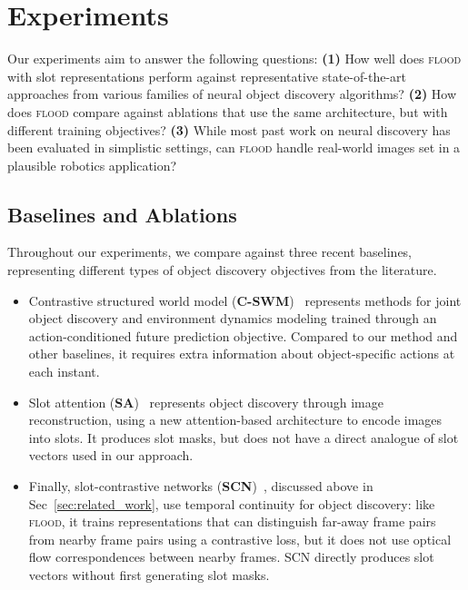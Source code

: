 \documentclass{article}
\begin{document}
\section{Experiments}
\label{sec:experiments}

Our experiments aim to answer the following questions: \textbf{(1)} How well does \textsc{flood} with slot representations perform against representative state-of-the-art approaches from various families of neural object discovery algorithms? \textbf{(2)} How does \textsc{flood} compare against ablations that use the same architecture, but with different training objectives? \textbf{(3)} While most past work on neural discovery has been evaluated in simplistic settings, can \textsc{flood} handle real-world images set in a plausible robotics application?


\subsection{Baselines and Ablations}

Throughout our experiments, we compare against three recent baselines, representing different types of object discovery objectives from the literature. 

\begin{itemize}[leftmargin=*]
 \item Contrastive structured world model (\textbf{C-SWM})~\cite{kipf2019contrastive} represents methods for joint object discovery and environment dynamics modeling trained through an action-conditioned future prediction objective. Compared to our method and other baselines, it requires extra information about object-specific actions at each instant. 
 \item  Slot attention (\textbf{SA})~\cite{locatello2020object} represents object discovery through image reconstruction, using a new attention-based architecture to encode images into slots. It produces slot masks, but does not have a direct analogue of slot vectors used in our approach. 
 \item  Finally, slot-contrastive networks (\textbf{SCN})~\cite{racah2020slot}, discussed above in Sec~\ref{sec:related_work}, use temporal continuity for object discovery: like \textsc{flood}, it trains representations that can distinguish far-away frame pairs from nearby frame pairs using a contrastive loss, but it does not use optical flow correspondences between nearby frames. SCN directly produces slot vectors without first generating slot masks.
\end{itemize}
\end{document}
